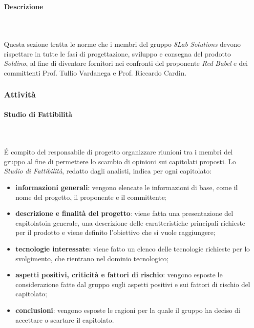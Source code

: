 \paragraph{Descrizione} \mbox{}\\ \mbox{}\\
	Questa sezione tratta le norme che i membri del gruppo \textit{8Lab Solutions} 
devono rispettare in tutte le fasi di progettazione, sviluppo e consegna del 
prodotto \textit{Soldino}, al fine di diventare fornitori nei confronti del 
proponente \textit{Red Babel} e dei committenti Prof. Tullio Vardanega e Prof. 
Riccardo Cardin.

\subsubsection{Attività}

\paragraph{Studio di Fattibilità} \mbox{}\\ \mbox{}\\
\'E compito del responsabile di progetto organizzare riunioni tra i membri del 
gruppo al fine di permettere lo scambio di opinioni sui capitolati proposti.
Lo \textit{Studio di Fattibilità}, redatto dagli analisti, indica per ogni 
capitolato\glo:
	\begin{itemize}
		\item \textbf{informazioni generali}: vengono elencate le informazioni di 
			base, come il nome del progetto, il proponente e il committente;
		\item \textbf{descrizione e finalità del progetto}: viene fatta una 
			presentazione del capitolato\glosp in generale, una descrizione delle 
			caratteristiche principali richieste per il prodotto e viene definito 
			l'obiettivo che si vuole raggiungere;
		\item \textbf{tecnologie interessate}: viene fatto un elenco delle tecnologie 
			richieste per lo svolgimento, che rientrano nel dominio tecnologico;
		\item \textbf{aspetti positivi, criticità e fattori di rischio}: vengono 
			esposte le considerazione fatte dal gruppo sugli aspetti positivi e sui fattori 
			di rischio del capitolato\glo;
		\item \textbf{conclusioni}: vengono esposte le ragioni per la quale il gruppo 
			ha deciso di accettare o scartare il capitolato\glo.
	\end{itemize}
		
